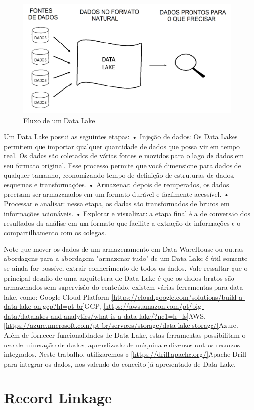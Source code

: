 \begin{figure}[!ht]
\centering
\includegraphics[width=0.3\linewidth]{figuras/DL.png}
\caption{Fluxo de um Data Lake}
\label{fig3}
\end{figure}

Um Data Lake possui as seguintes etapas:
• Injeção de dados: Os Data Lakes permitem que importar qualquer quantidade de dados que possa vir em tempo real. Os dados são coletados de várias fontes e movidos para o lago de dados em seu formato original. Esse processo permite que você dimensione para dados de qualquer tamanho, economizando tempo de definição de estruturas de dados, esquemas e transformações.
• Armazenar: depois de recuperados, os dados precisam ser armazenados em um formato durável e facilmente acessível.
• Processar e analisar: nessa etapa, os dados são transformados de brutos em informações acionáveis.
• Explorar e visualizar: a etapa final é a de conversão dos resultados da análise em um formato que facilite a extração de informações e o compartilhamento com os colegas.

Note que mover os dados de um armazenamento em Data WareHouse ou outras abordagens para a abordagem "armazenar tudo" de um  Data Lake é útil somente se ainda for possível extrair conhecimento de todos os dados.
Vale ressaltar que o principal desafio de uma arquitetura de Data Lake é que os dados brutos são armazenados sem supervisão do conteúdo.
existem várias ferramentas para data lake, como: Google Cloud Platform \ref{https://cloud.google.com/solutions/build-a-data-lake-on-gcp?hl=pt-br}{GCP}, \ref{https://aws.amazon.com/pt/big-data/datalakes-and-analytics/what-is-a-data-lake/?nc1=h_ls}{AWS}, \ref{https://azure.microsoft.com/pt-br/services/storage/data-lake-storage/}{Azure}.  Além de fornecer funcionalidades de Data Lake, estas ferramentas possibilitam o uso de mineração de dados, aprendizado de máquina e diversos outros recursos integrados.
Neste trabalho, utilizaremos o \ref{https://drill.apache.org/}{Apache Drill} para integrar os dados, nos valendo do conceito já apresentado de Data Lake.

\section{Record Linkage}

